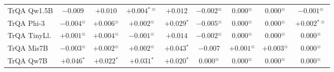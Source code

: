 {\begin{tabular}{lcccccccc}
TrQA Qw1.5B & $-0.009$ & $+0.010$ & $+0.004$$^{*\equiv}$ & $+0.012$ & $-0.002$$^{\equiv}$ & $0.000$$^{\equiv}$ & $0.000$$^{\equiv}$ & $-0.001$$^{\equiv}$ \\
TrQA Phi-3 & $-0.004$$^{\equiv}$ & $+0.006$$^{\equiv}$ & $+0.002$$^{\equiv}$ & $+0.029$$^{*}$ & $-0.005$$^{\equiv}$ & $0.000$$^{\equiv}$ & $0.000$$^{\equiv}$ & $+0.002$$^{*\equiv}$ \\
TrQA TinyLl. & $+0.001$$^{\equiv}$ & $+0.004$$^{\equiv}$ & $-0.001$$^{\equiv}$ & $+0.014$ & $-0.002$$^{\equiv}$ & $0.000$$^{\equiv}$ & $0.000$$^{\equiv}$ & $0.000$$^{\equiv}$ \\
TrQA Mis7B & $-0.003$$^{\equiv}$ & $+0.002$$^{\equiv}$ & $+0.002$$^{\equiv}$ & $+0.043$$^{*}$ & $-0.007$ & $+0.001$$^{\equiv}$ & $+0.003$$^{\equiv}$ & $0.000$$^{\equiv}$ \\
TrQA Qw7B & $+0.046$$^{*}$ & $+0.022$$^{*}$ & $+0.031$$^{*}$ & $+0.020$$^{*}$ & $0.000$$^{\equiv}$ & $0.000$$^{\equiv}$ & $0.000$$^{\equiv}$ & $0.000$$^{\equiv}$ \\
\bottomrule
\end{tabular}
}
\newcommand{\SinkTableOnpolicy}{%
\begin{tabular}{lrrrr}
\toprule
Model & questions & accuracy & rows used & mean answer tokens \\
\midrule
Qwen2.5-3B & 2,000 & 42.5\% & 2,000 & 5.5 \\
Qwen2.5-1.5B & 2,000 & 31.4\% & 2,000 & 5.8 \\
Phi-3-mini & 2,000 & 56.2\% & 2,000 & 6.0 \\
TinyLlama-1.1B & 2,000 & 26.4\% & 2,000 & 18.9 \\
Mistral-7B & 2,000 & 66.5\% & 2,000 & 14.0 \\
Qwen2.5-7B & 2,000 & 51.4\% & 2,000 & 5.3 \\
\bottomrule
\end{tabular}
}
